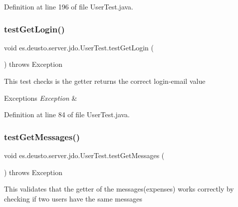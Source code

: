 Definition at line 196 of file User\+Test.\+java.

\mbox{\label{classes_1_1deusto_1_1server_1_1jdo_1_1_user_test_a5620fe8a855002a48cdc5b260491ef8f}} 
\subsubsection{\texorpdfstring{test\+Get\+Login()}{testGetLogin()}}
{\footnotesize\ttfamily void es.\+deusto.\+server.\+jdo.\+User\+Test.\+test\+Get\+Login (\begin{DoxyParamCaption}{ }\end{DoxyParamCaption}) throws Exception}

This test checks is the getter returns the correct login-\/email value 
\begin{DoxyExceptions}{Exceptions}
{\em Exception} & \\
\hline
\end{DoxyExceptions}


Definition at line 84 of file User\+Test.\+java.

\mbox{\label{classes_1_1deusto_1_1server_1_1jdo_1_1_user_test_a73c44236a983959ce39adbd4803c83c1}} 
\subsubsection{\texorpdfstring{test\+Get\+Messages()}{testGetMessages()}}
{\footnotesize\ttfamily void es.\+deusto.\+server.\+jdo.\+User\+Test.\+test\+Get\+Messages (\begin{DoxyParamCaption}{ }\end{DoxyParamCaption}) throws Exception}

This validates that the getter of the messages(expenses) works correctly by checking if two users have the same messages~\newline

